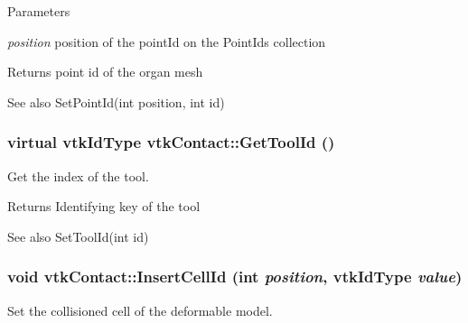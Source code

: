 \begin{DoxyParams}{Parameters}
\item[{\em position}]position of the pointId on the PointIds collection \end{DoxyParams}
\begin{DoxyReturn}{Returns}
point id of the organ mesh 
\end{DoxyReturn}
\begin{DoxySeeAlso}{See also}
SetPointId(int position, int id) 
\end{DoxySeeAlso}
\hypertarget{classvtkContact_a6da6c11b7dde677ffe8305216d07b397}{
\subsubsection[{GetToolId}]{\setlength{\rightskip}{0pt plus 5cm}virtual vtkIdType vtkContact::GetToolId ()}}
\label{classvtkContact_a6da6c11b7dde677ffe8305216d07b397}


Get the index of the tool. 

\begin{DoxyReturn}{Returns}
Identifying key of the tool 
\end{DoxyReturn}
\begin{DoxySeeAlso}{See also}
SetToolId(int id) 
\end{DoxySeeAlso}
\hypertarget{classvtkContact_a58075df90c9c5fb7fa5972de36898d9a}{
\subsubsection[{InsertCellId}]{\setlength{\rightskip}{0pt plus 5cm}void vtkContact::InsertCellId (int {\em position}, \/  vtkIdType {\em value})}}
\label{classvtkContact_a58075df90c9c5fb7fa5972de36898d9a}


Set the collisioned cell of the deformable model. 


